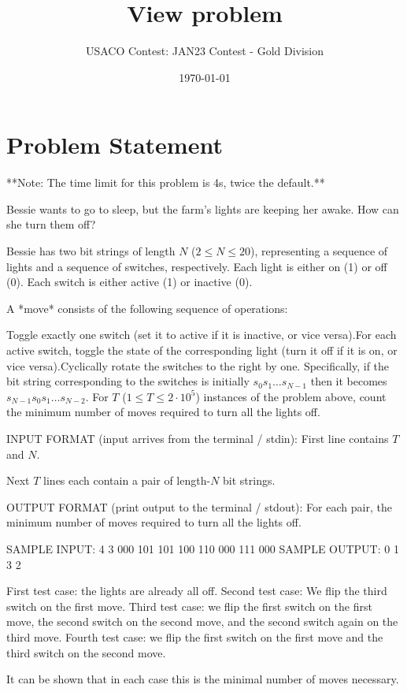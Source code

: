 \documentclass[12pt]{article}
\title{View problem}
\author{USACO Contest: JAN23 Contest - Gold Division}
\date{\today}
\begin{document}
\maketitle

\section*{Problem Statement}


**Note: The time limit for this problem is 4s, twice the default.**

Bessie wants to go to sleep, but the farm's lights are keeping her awake. How
can she turn them off?

Bessie has two bit strings of length $N$ ($2\le N\le 20$), representing a
sequence of lights and a sequence of switches, respectively. Each light is
either on (1) or off (0). Each switch is either active (1) or inactive (0).

A *move* consists of the following sequence of operations:

Toggle exactly one switch (set it to active if it is inactive, or vice
versa).For each active switch, toggle the state of the corresponding light (turn it
off if it is on, or vice versa).Cyclically rotate the switches to the right by one. Specifically, if the bit
string corresponding to the switches is initially $s_0s_1\dots s_{N-1}$  then it
becomes $s_{N-1}s_0s_1\dots s_{N-2}$.
For $T$ ($1\le T\le 2\cdot 10^5$) instances of the problem above, count the
minimum number of moves required to turn all the lights off. 

INPUT FORMAT (input arrives from the terminal / stdin):
First line contains $T$ and $N$.

Next $T$ lines each contain a pair of length-$N$ bit strings.

OUTPUT FORMAT (print output to the terminal / stdout):
For each pair, the minimum number of moves required to turn all the lights off.

SAMPLE INPUT:
4 3
000 101
101 100
110 000
111 000
SAMPLE OUTPUT: 
0
1
3
2

 First test case: the lights are already all off.  Second test
case: We flip the third switch on the first move.  Third test case: we
flip the first switch on the first move, the second switch on the second move,
and the second switch again on the third move.  Fourth test case: we
flip the first switch on the first move and the third switch on the second move.

It can be shown that in each case this is the minimal number of moves necessary.
\end{document}
